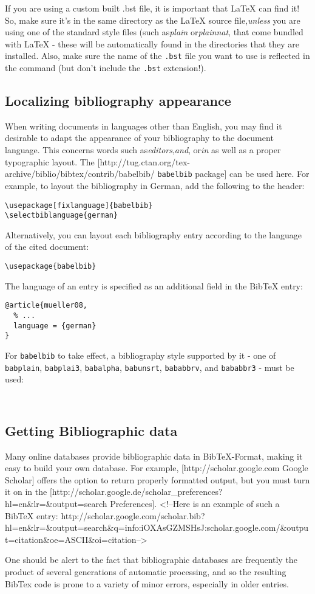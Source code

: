 If you are using a custom built .bst file, it is important that LaTeX can find
it! So, make sure it's in the same directory as the LaTeX source
file,\textit{unless} you are using one of the standard style files (such
as\textit{plain} or\textit{plainnat}, that come bundled with LaTeX - these will
be automatically found in the directories that they are installed. Also, make
sure the name of the \verb|.bst| file you want to use is reflected in
the\verb|| command (but don't include the \verb|.bst|
extension!).

\subsection{Localizing bibliography appearance}
When writing documents in languages other than English, you may find it
desirable to adapt the appearance of your bibliography to the document
language. This concerns words such as\textit{editors},\textit{and},
or\textit{in} as well as a proper typographic layout. The
[http://tug.ctan.org/tex-archive/biblio/bibtex/contrib/babelbib/
\verb|babelbib| package] can be used here. For example, to layout the
bibliography in German, add the following to the header:

\begin{lstlisting}
\usepackage[fixlanguage]{babelbib}
\selectbiblanguage{german}
\end{lstlisting}
Alternatively, you can layout each bibliography entry according to the language of the cited document:

\begin{lstlisting}
\usepackage{babelbib}
\end{lstlisting}
The language of an entry is specified as an additional field in the BibTeX entry:

\begin{lstlisting}
@article{mueller08,
  % ...
  language = {german}
}
\end{lstlisting}
For \verb|babelbib| to take effect, a bibliography style supported by it - one of \verb|babplain|, \verb|babplai3|, \verb|babalpha|, \verb|babunsrt|, \verb|bababbrv|, and \verb|bababbr3| - must be used:

\begin{lstlisting}


\end{lstlisting}
\subsection{Getting Bibliographic data}
Many online databases provide bibliographic data in BibTeX-Format, making it easy to build your own database.  
For example, [http://scholar.google.com Google Scholar] offers the option to
return properly formatted output, but you must turn it on in the
[http://scholar.google.de/scholar\_preferences?hl=en\&lr=\&output=search
Preferences]. <!--Here is an example of such a BibTeX entry:
http://scholar.google.com/scholar.bib?hl=en\&lr=\&output=search\&q=info:iOXAsGZMSHsJ:scholar.google.com/\&output=citation\&oe=ASCII\&oi=citation-->

One should be alert to the fact that bibliographic databases are frequently the
product of several generations of automatic processing, and so the resulting
BibTex code is prone to a variety of minor errors, especially in older entries.
